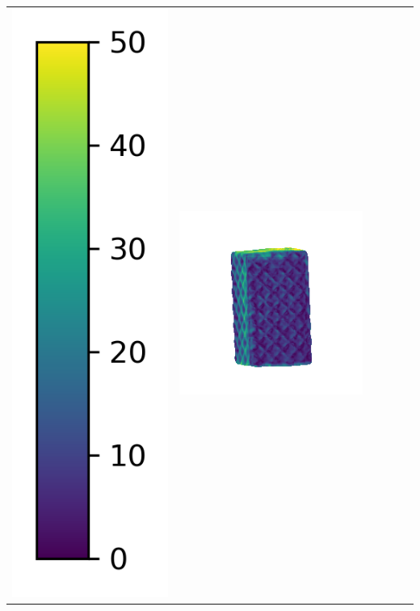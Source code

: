 \begin{center}
\begin{tabularx}{\linewidth}{@{}Y@{}Y@{}Y@{}Y@{}Y@{}Y@{}}
\includegraphics[width=0.2\linewidth]{semisynthetic/colorbar_error_vertical.png} &
\includegraphics[width=\linewidth]{semisynthetic/20160617_18_ours_err.png} &

\end{tabularx}
\end{center}
